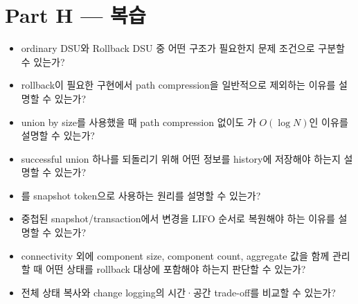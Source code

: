 \section{Part H --- 복습}

\begin{checklistbox}[복습 체크리스트]
\begin{itemize}
\item ordinary DSU와 Rollback DSU 중 어떤 구조가 필요한지 문제 조건으로 구분할 수 있는가?
\item rollback이 필요한 구현에서 path compression을 일반적으로 제외하는 이유를 설명할 수 있는가?
\item union by size를 사용했을 때 path compression 없이도 가 $O(\log N)$인 이유를 설명할 수 있는가?
\item successful union 하나를 되돌리기 위해 어떤 정보를 history에 저장해야 하는지 설명할 수 있는가?
\item {}를 snapshot token으로 사용하는 원리를 설명할 수 있는가?
\item 중첩된 snapshot/transaction에서 변경을 LIFO 순서로 복원해야 하는 이유를 설명할 수 있는가?
\item connectivity 외에 component size, component count, aggregate 값을 함께 관리할 때 어떤 상태를 rollback 대상에 포함해야 하는지 판단할 수 있는가?
\item 전체 상태 복사와 change logging의 시간·공간 trade-off를 비교할 수 있는가?
\end{itemize}
\end{checklistbox}
